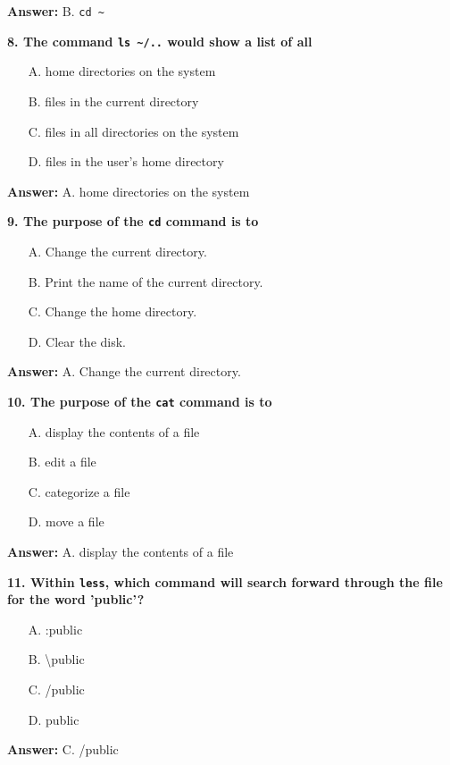 \documentclass{article}
\begin{document}
\textbf{Answer:} B. \texttt{cd \~}

\vspace{0.5cm}

\textbf{8. The command \texttt{ls \~{}/..} would show a list of all}

\begin{itemize}
  \item[A.] home directories on the system
  \item[B.] files in the current directory
  \item[C.] files in all directories on the system
  \item[D.] files in the user's home directory
\end{itemize}

\textbf{Answer:} A. home directories on the system

\vspace{0.5cm}

\textbf{9. The purpose of the \texttt{cd} command is to}

\begin{itemize}
  \item[A.] Change the current directory.
  \item[B.] Print the name of the current directory.
  \item[C.] Change the home directory.
  \item[D.] Clear the disk.
\end{itemize}

\textbf{Answer:} A. Change the current directory.

\vspace{0.5cm}

\textbf{10. The purpose of the \texttt{cat} command is to}

\begin{itemize}
  \item[A.] display the contents of a file
  \item[B.] edit a file
  \item[C.] categorize a file
  \item[D.] move a file
\end{itemize}

\textbf{Answer:} A. display the contents of a file

\vspace{0.5cm}

\textbf{11. Within \texttt{less}, which command will search forward through the file for the word 'public'?}

\begin{itemize}
  \item[A.] :public
  \item[B.] \textbackslash public
  \item[C.] /public
  \item[D.] public
\end{itemize}

\textbf{Answer:} C. /public

\end{document}
